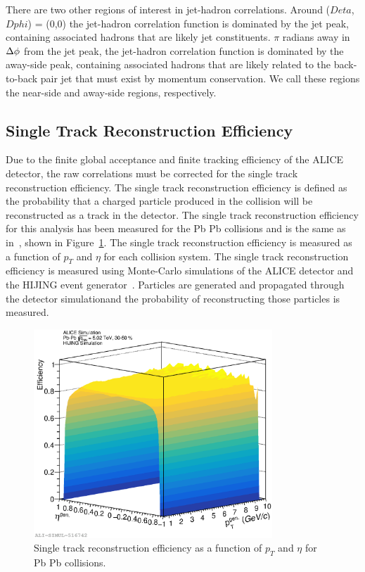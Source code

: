 There are two other regions of interest in jet-hadron correlations. Around ($Deta$, $Dphi$) = (0,0) the jet-hadron correlation function is dominated by the jet peak, containing associated hadrons that are likely jet constituents. $\pi$ radians away in $\Delta \phi$ from the jet peak, the jet-hadron correlation function is dominated by the away-side peak, containing associated hadrons that are likely related to the back-to-back pair jet that must exist by momentum conservation. We call these regions the near-side and away-side regions, respectively. 

\subsection*{Single Track Reconstruction Efficiency}

Due to the finite global acceptance and finite tracking efficiency of the ALICE detector, the raw correlations must be corrected for the single track reconstruction efficiency. The single track reconstruction efficiency is defined as the probability that a charged particle produced in the collision will be reconstructed as a track in the detector. The single track reconstruction efficiency for this analysis has been measured for the Pb Pb collisions and is the same as in~\cite{CharlesThesis}, shown in Figure~\ref{fig:STRE}. The single track reconstruction efficiency is measured as a function of $p_T$ and $\eta$ for each collision system. The single track reconstruction efficiency is measured using Monte-Carlo simulations of the ALICE detector and the HIJING event generator~\cite{HIJING}. Particles are generated and propagated through the detector simulationand the probability of reconstructing those particles is measured.  

\begin{figure}
    \centering
    \includegraphics[width=0.8\textwidth]{figures/eps/Prelim_Approval_STRE_2.eps}
    \caption{Single track reconstruction efficiency as a function of $p_T$ and $\eta$ for Pb Pb collisions.}\label{fig:STRE}
\end{figure}

